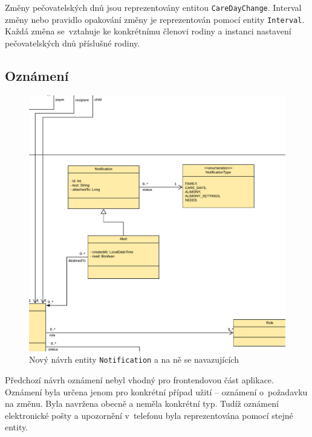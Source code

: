         Změny pečovatelských dnů jsou reprezentovány entitou \verb|CareDayChange|. Interval změny nebo pravidlo opakování změny je reprezentován pomocí entity \verb|Interval|. Každá změna se~vztahuje ke konkrétnímu členovi rodiny a instanci nastavení pečovatelských dnů příslušné rodiny.
        
    \subsection{Oznámení}\label{navrh:upravy:notification}
        \begin{figure}\centering
	       \includegraphics[width=1.0\textwidth]{pdfs/Notification2}
	       \caption[Nový návrh oznámení]{Nový návrh entity \texttt{Notification} a na ně se navazujících}\label{image:notification2}
        \end{figure}
        Předchozí návrh oznámení nebyl vhodný pro frontendovou část aplikace. Oznámení byla určena jenom pro konkrétní případ užití -- oznámení o~požadavku na změnu. Byla navržena obecně a neměla konkrétní typ. Tudíž oznámení elektronické pošty a upozornění v~telefonu byla reprezentována pomocí stejné entity.
        
